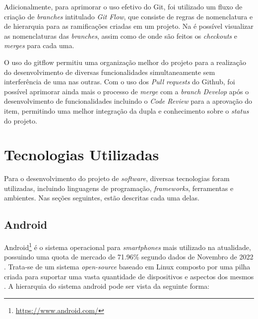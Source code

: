 Adicionalmente, para aprimorar o uso efetivo do Git, foi utilizado um fluxo de criação de \textit{branches} intitulado \textit{Git Flow}, que consiste de regras de nomenclatura e de hierarquia para as ramificações criadas em um projeto. Na  é possível visualizar as nomenclaturas das \textit{branches}, assim como de onde são feitos os \textit{checkouts} e \textit{merges} para cada uma.


O uso do gitflow permitiu uma organização melhor do projeto para a realização do desenvolvimento de diversas funcionalidades simultaneamente sem interferência de uma nas outras. Com o uso dos \textit{Pull requests} do Github, foi possível aprimorar ainda mais o processo de \textit{merge} com a \textit{branch Develop} após o desenvolvimento de funcionalidades incluindo o \textit{Code Review} para a aprovação do item, permitindo uma melhor integração da dupla e conhecimento sobre o \textit{status} do projeto.

\section{Tecnologias Utilizadas}

Para o desenvolvimento do projeto de \textit{software}, diversas tecnologias foram utilizadas, incluindo linguagens de programação, \textit{frameworks}, ferramentas e ambientes. Nas seções seguintes, estão descritas cada uma delas.

\subsection{Android}

Android\footnote{\url{https://www.android.com/}} é o sistema operacional para \textit{smartphones} mais utilizado na atualidade, possuindo uma quota de mercado de 71.96\% segundo dados de Novembro de 2022 \cite{mobile-os}. Trata-se de um sistema \textit{open-source} baseado em Linux composto por uma pilha criada para suportar uma vasta quantidade de dispositivos e aspectos dos mesmos \cite{android}. A hierarquia do sistema android pode ser vista da seguinte forma:

